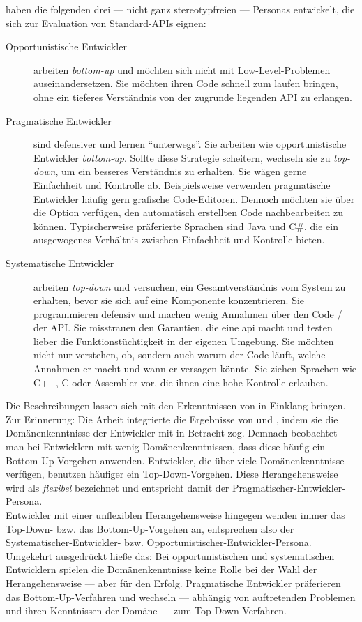 \begin{important}
\cite{Stylos:2007jb,clarke:DSP:2007:1080} haben die folgenden drei --- nicht ganz stereotypfreien --- Personas entwickelt, die sich zur Evaluation von Standard-APIs eignen:
\begin{description}
\item[Opportunistische Entwickler] arbeiten \textit{bottom-up} und möchten sich nicht mit Low-Level-Problemen auseinandersetzen. Sie möchten ihren Code schnell zum laufen bringen, ohne ein tieferes Verständnis von der zugrunde liegenden API zu erlangen.
\item[Pragmatische Entwickler] sind defensiver und lernen ``unterwegs''. Sie arbeiten wie opportunistische Entwickler \textit{bottom-up}. Sollte diese Strategie scheitern, wechseln sie zu \textit{top-down}, um ein besseres Verständnis zu erhalten. Sie wägen gerne Einfachheit und Kontrolle ab. Beispielsweise verwenden pragmatische Entwickler häufig gern grafische Code-Editoren. Dennoch möchten sie über die Option verfügen, den automatisch erstellten Code nachbearbeiten zu können. Typischerweise präferierte Sprachen sind Java und C\#, die ein ausgewogenes Verhältnis zwischen Einfachheit und Kontrolle bieten.
\item[Systematische Entwickler] arbeiten \textit{top-down} und versuchen, ein Gesamtverständnis vom System zu erhalten, bevor sie sich auf eine Komponente konzentrieren. Sie programmieren defensiv und machen wenig Annahmen über den Code / der API. Sie misstrauen den Garantien, die eine \acrshort{api} macht und testen lieber die Funktionstüchtigkeit in der eigenen Umgebung. Sie möchten nicht nur verstehen, ob, sondern auch warum der Code läuft, welche Annahmen er macht und wann er versagen könnte. Sie ziehen Sprachen wie C++, C oder Assembler vor, die ihnen eine hohe Kontrolle erlauben.
\end{description}

Die Beschreibungen lassen sich mit den Erkenntnissen von \cite{Shaft:1998tc} in Einklang bringen. Zur Erinnerung: Die Arbeit integrierte die Ergebnisse von \cite{Brooks:1983fj} und \cite{Pennington:1987dc}, indem sie die Domänenkenntnisse der Entwickler mit in Betracht zog. Demnach beobachtet man bei Entwicklern mit wenig Domänenkenntnissen, dass diese häufig ein Bottom-Up-Vorgehen anwenden. Entwickler, die über viele Domänenkenntnisse verfügen, benutzen häufiger ein Top-Down-Vorgehen. Diese Herangehensweise wird als \textit{flexibel} bezeichnet und entspricht damit der Pragmatischer-Entwickler-Persona.
\\ Entwickler mit einer unflexiblen Herangehensweise hingegen wenden immer das Top-Down- bzw. das Bottom-Up-Vorgehen an, entsprechen also der Systematischer-Entwickler- bzw. Opportunistischer-Entwickler-Persona.
\\ Umgekehrt ausgedrückt hieße das: Bei opportunistischen und systematischen Entwicklern spielen die Domänenkenntnisse keine Rolle bei der Wahl der Herangehensweise --- aber für den Erfolg. Pragmatische Entwickler präferieren das Bottom-Up-Verfahren und wechseln --- abhängig von auftretenden Problemen und ihren Kenntnissen der Domäne --- zum Top-Down-Verfahren.   


\end{important}
